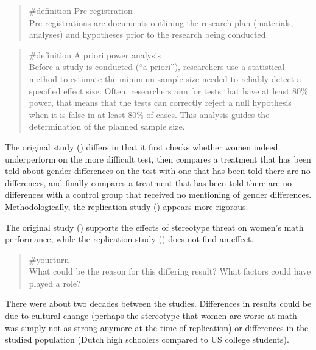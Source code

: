 \documentclass[
  letterpaper,
]{book}
\begin{document}
\begin{quote}
\label{def-preregistration}{\#definition}
Pre-registration\\
Pre-registrations are documents outlining the research plan (materials,
analyses) and hypotheses prior to the research being conducted.
\end{quote}

\begin{quote}
\label{def-apriorianalysis}{\#definition} A priori power
analysis\\
Before a study is conducted (``a priori''), researchers use a
statistical method to estimate the minimum sample size needed to
reliably detect a specified effect size. Often, researchers aim for
tests that have at least 80\% power, that means that the tests can
correctly reject a null hypothesis when it is false in at least 80\% of
cases. This analysis guides the determination of the planned sample
size.
\end{quote}

The original study () differs in that it first checks whether women indeed
underperform on the more difficult test, then compares a treatment that
has been told about gender differences on the test with one that has
been told there are no differences, and finally compares a treatment
that has been told there are no differences with a control group that
received no mentioning of gender differences. Methodologically, the
replication study () appears more rigorous.

The original study () supports the effects of stereotype threat on women's math
performance, while the replication study
() does not find
an effect.

\begin{quote}
{\#yourturn}\\
What could be the reason for this differing result? What factors could
have played a role?
\end{quote}

There were about two decades between the studies. Differences in results
could be due to cultural change (perhaps the stereotype that women are
worse at math was simply not as strong anymore at the time of
replication) or differences in the studied population (Dutch high
schoolers compared to US college students).
\end{document}
